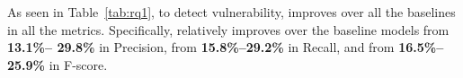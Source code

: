 As seen in Table~\ref{tab:rq1}, to detect vulnerability, {\tool}
improves over all the baselines in all the metrics. Specifically,
{\tool} relatively improves over the baseline models from {\bf 13.1\%--
  29.8\%} in Precision, from {\bf 15.8\%--29.2\%} in Recall, and from
{\bf 16.5\%--25.9\%} in F-score.








